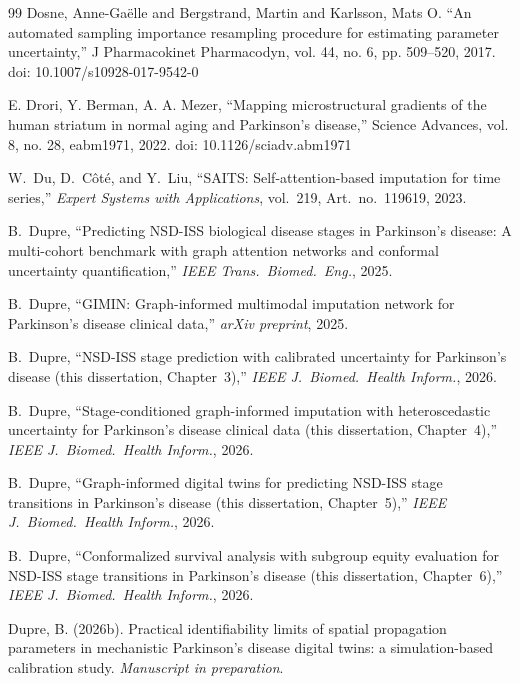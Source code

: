 \begin{thebibliography}{99}
 Dosne, Anne-Ga\"elle and Bergstrand, Martin and Karlsson, Mats O. ``An automated sampling importance resampling procedure for estimating parameter uncertainty,'' J Pharmacokinet Pharmacodyn, vol. 44, no. 6, pp. 509--520, 2017. doi: 10.1007/s10928-017-9542-0

 E. Drori, Y. Berman, A. A. Mezer, ``Mapping microstructural gradients of the human striatum in normal aging and Parkinson's disease,'' Science Advances, vol. 8, no. 28, eabm1971, 2022. doi: 10.1126/sciadv.abm1971

W.~Du, D.~C\^{o}t\'{e}, and Y.~Liu, ``SAITS: Self-attention-based imputation for time series,'' \textit{Expert Systems with Applications}, vol.~219, Art.\ no.~119619, 2023.

B.~Dupre, ``Predicting NSD-ISS biological disease stages in Parkinson's disease: A multi-cohort benchmark with graph attention networks and conformal uncertainty quantification,'' \textit{IEEE Trans.\ Biomed.\ Eng.}, 2025.

B.~Dupre, ``GIMIN: Graph-informed multimodal imputation network for Parkinson's disease clinical data,'' \textit{arXiv preprint}, 2025.

B.~Dupre, ``NSD-ISS stage prediction with calibrated uncertainty for Parkinson's disease (this dissertation, Chapter~3),'' \textit{IEEE J.\ Biomed.\ Health Inform.}, 2026.

B.~Dupre, ``Stage-conditioned graph-informed imputation with heteroscedastic uncertainty for Parkinson's disease clinical data (this dissertation, Chapter~4),'' \textit{IEEE J.\ Biomed.\ Health Inform.}, 2026.

B.~Dupre, ``Graph-informed digital twins for predicting NSD-ISS stage transitions in Parkinson's disease (this dissertation, Chapter~5),'' \textit{IEEE J.\ Biomed.\ Health Inform.}, 2026.

B.~Dupre, ``Conformalized survival analysis with subgroup equity evaluation for NSD-ISS stage transitions in Parkinson's disease (this dissertation, Chapter~6),'' \textit{IEEE J.\ Biomed.\ Health Inform.}, 2026.


Dupre, B. (2026b).
\newblock Practical identifiability limits of spatial propagation parameters in mechanistic Parkinson's disease digital twins: a simulation-based calibration study.
\newblock \emph{Manuscript in preparation}.


\end{thebibliography}
